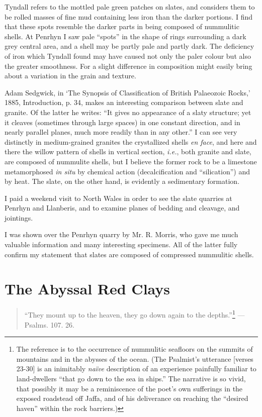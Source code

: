 \documentclass[a4paper, 12pt, oneside]{article}
\begin{document}
Tyndall refers to the mottled pale green patches on slates, and considers them to be rolled masses of fine mud containing less iron than the darker portions. I find that these spots resemble the darker parts in being composed of nummulitic shells. At Penrhyn I saw pale ``spots'' in the shape of rings surrounding a dark grey central area, and a shell may be partly pale and partly dark. The deficiency of iron which Tyndall found may have caused not only the paler colour but also the greater smoothness. For a slight difference in composition might easily bring about a variation in the grain and texture.

Adam Sedgwick, in `The Synopsis of Classification of British Palaeozoic Rocks,' 1885, Introduction, p. 34, makes an interesting comparison between slate and granite. Of the latter he writes: ``It gives no appearance of a slaty structure; yet it cleaves (sometimes through large spaces) in one constant direction, and in nearly parallel planes, much more readily than in any other.'' I can see very distinctly in medium-grained granites the crystallized shells \emph{en face}, and here and there the willow pattern of shells in vertical section, \emph{i.e.}, both granite and slate, are composed of nummulite shells, but I believe the former rock to be a limestone metamorphosed \emph{in situ} by chemical action (decalcification and ``silication'') and by heat. The slate, on the other hand, is evidently a sedimentary formation.

I paid a weekend visit to North Wales in order to see the slate quarries at Penrhyn and Llanberis, and to examine planes of bedding and cleavage, and jointings.

I was shown over the Penrhyn quarry by Mr. R. Morris, who gave me much valuable information and many interesting specimens. All of the latter fully confirm my statement that slates are composed of compressed nummulitic shells.
\clearpage
\section{The Abyssal Red Clays}
\begin{quote}
``They mount up to the heaven, they go down again to the depths.''\footnote{The reference is to the occurrence of nummulitic seafloors on the summits of mountains and in the abysses of the ocean. (The Psalmist's utterance [verses 23-30] is an inimitably \emph{naïve} description of an experience painfully familiar to land-dwellers ``that go down to the sea in ships.'' The narrative is so vivid, that possibly it may be a reminiscence of the poet's own sufferings in the exposed roadstead off Jaffa, and of his deliverance on reaching the ``desired haven'' within the rock barriers.)} --- Psalms. 107. 26.
\end{quote}
\end{document}
